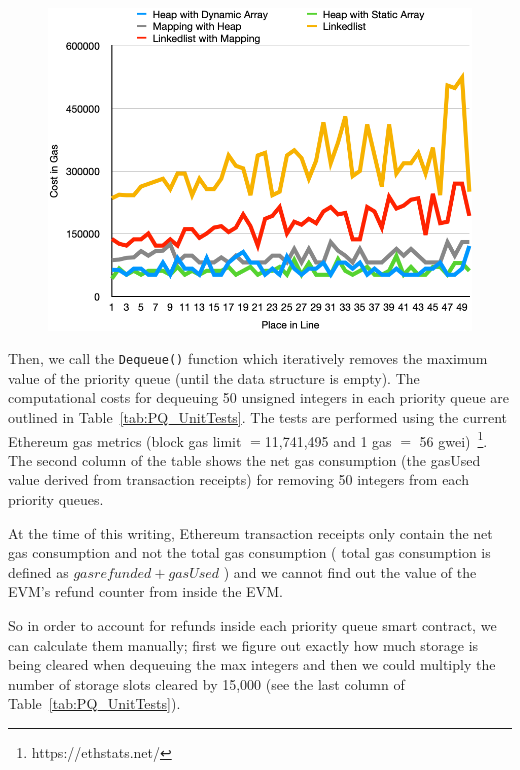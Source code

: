 \begin{figure}[htb!p]
\centering
\includegraphics[width=1\textwidth]{fig/average_uints_insertion.png}
\caption{\footnotesize{}  \label{fig:average_uints_insertion}}
\end{figure}


Then, we call the \texttt{Dequeue()} function which iteratively removes the maximum value of the priority queue (until the data structure is empty). The computational costs for dequeuing 50 unsigned integers in each priority queue are outlined in Table~\ref{tab:PQ_UnitTests}. The tests are performed using the current Ethereum gas metrics (block gas limit $=$11,741,495 and 1 gas $=$ 56 gwei)~\footnote{https://ethstats.net/}. The second column of the table shows the net gas consumption (the gasUsed value derived from transaction receipts) for removing 50 integers from each priority queues.  

At the time of this writing, Ethereum transaction receipts only contain the net gas consumption and not the total gas consumption ( total gas consumption is defined as $gas refunded + gasUsed$ ) and we cannot find out the value of the EVM's refund counter from inside the EVM.

So in order to account for refunds inside each priority queue smart contract, we can calculate them manually; first we figure out exactly how much storage is being cleared when dequeuing  the max integers and then we could multiply the number of storage slots cleared by 15,000 (see the last column of Table~\ref{tab:PQ_UnitTests}).

